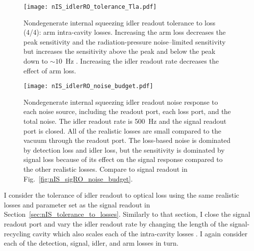 \begin{figure}
    \centering
    \texttt{[image: nIS\_idlerRO\_tolerance\_Tla.pdf]} 
    \caption{  Nondegenerate internal squeezing idler readout tolerance to loss (4/4): arm intra-cavity losses. Increasing the arm loss decreases the peak sensitivity and the radiation-pressure noise--limited sensitivity but increases the sensitivity above the peak and below the peak down to $\sim10$~Hz . Increasing the idler readout rate decreases the effect of arm loss. }
    \label{fig:nIS_idlerRO_tolerance_Tla}
\end{figure}
\begin{figure}
    \centering
    \texttt{[image: nIS\_idlerRO\_noise\_budget.pdf]} 
    \caption{  Nondegenerate internal squeezing idler readout noise response to each noise source, including the readout port, each loss port, and the total noise. The idler readout rate is 500~Hz and the signal readout port is closed. All of the realistic losses are small compared to the vacuum through the readout port. The loss-based noise is dominated by detection loss and idler loss, but the sensitivity is dominated by signal loss because of its effect on the signal response compared to the other realistic losses.  Compare to signal readout in Fig.~\ref{fig:nIS_sigRO_noise_budget}.}
    \label{fig:nIS_idlerRO_noise_budget}
\end{figure}


I consider the tolerance of idler readout to optical loss using the same realistic losses and parameter set as the signal readout in Section~\ref{sec:nIS_tolerance_to_losses}. Similarly to that section, I close the signal readout port and vary the idler readout rate by changing the length of the signal-recycling cavity which also scales each of the intra-cavity losses . I again consider each of the detection, signal, idler, and arm losses in turn.

